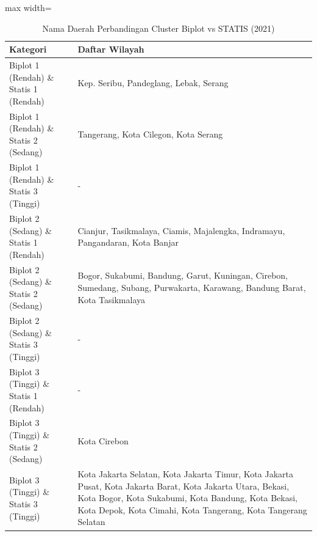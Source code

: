 \begin{table}[H]
\centering
\caption{Nama Daerah Perbandingan Cluster Biplot vs STATIS (2021)} \label{tab:appbiplot_statis_comp_name_2021}
\begin{adjustbox}{max width=\textwidth}
\begin{tabular}{|p{4cm}|p{10cm}|}
\hline
\textbf{Kategori} & \textbf{Daftar Wilayah} \\
\hline
Biplot 1 (Rendah) \& Statis 1 (Rendah) & Kep. Seribu, Pandeglang, Lebak, Serang \\
\hline
Biplot 1 (Rendah) \& Statis 2 (Sedang) & Tangerang, Kota Cilegon, Kota Serang \\
\hline
Biplot 1 (Rendah) \& Statis 3 (Tinggi) & - \\
\hline
Biplot 2 (Sedang) \& Statis 1 (Rendah) & Cianjur, Tasikmalaya, Ciamis, Majalengka, Indramayu, Pangandaran, Kota Banjar \\
\hline
Biplot 2 (Sedang) \& Statis 2 (Sedang) & Bogor, Sukabumi, Bandung, Garut, Kuningan, Cirebon, Sumedang, Subang, Purwakarta, Karawang, Bandung Barat, Kota Tasikmalaya \\
\hline
Biplot 2 (Sedang) \& Statis 3 (Tinggi) & - \\
\hline
Biplot 3 (Tinggi) \& Statis 1 (Rendah) & - \\
\hline
Biplot 3 (Tinggi) \& Statis 2 (Sedang) & Kota Cirebon \\
\hline
Biplot 3 (Tinggi) \& Statis 3 (Tinggi) & Kota Jakarta Selatan, Kota Jakarta Timur, Kota Jakarta Pusat, Kota Jakarta Barat, Kota Jakarta Utara, Bekasi, Kota Bogor, Kota Sukabumi, Kota Bandung, Kota Bekasi, Kota Depok, Kota Cimahi, Kota Tangerang, Kota Tangerang Selatan \\
\hline
\end{tabular}
\end{adjustbox}
\end{table}